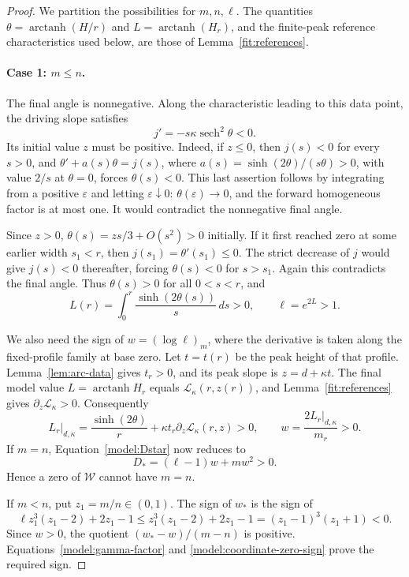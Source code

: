 \begin{proof}
We partition the possibilities for \(m,n,\ell\).
The quantities \(\theta=\operatorname{arctanh}(H/r)\) and
\(L=\operatorname{arctanh}(H_r)\), and the finite-peak reference
characteristics used below, are those of Lemma~\ref{fit:references}.

\paragraph{Case 1: \(m\le n\).}
The final angle is nonnegative.  Along the characteristic leading to
this data point, the driving slope satisfies
\[
 j'=-s\kappa\operatorname{sech}^2\theta<0.
\]
Its initial value \(z\) must be positive.  Indeed, if \(z\le0\), then
\(j(s)<0\) for every \(s>0\), and
\(\theta'+a(s)\theta=j(s)\), where
\(a(s)=\sinh(2\theta)/(s\theta)>0\), with value \(2/s\) at
\(\theta=0\), forces \(\theta(s)<0\).  This last assertion follows by
integrating from a positive \(\varepsilon\) and letting
\(\varepsilon\downarrow0\): \(\theta(\varepsilon)\to0\), and the
forward homogeneous factor is at most one.
It would contradict the nonnegative final angle.

Since \(z>0\), \(\theta(s)=zs/3+O(s^2)>0\) initially.
If it first reached zero at some earlier width \(s_1<r\), then
\(j(s_1)=\theta'(s_1)\le0\).  The strict decrease of \(j\) would give
\(j(s)<0\) thereafter, forcing \(\theta(s)<0\) for \(s>s_1\).
Again this contradicts the final angle.  Thus
\(\theta(s)>0\) for all \(0<s<r\), and
\[
 L(r)=\int_0^r\frac{\sinh(2\theta(s))}{s}\,ds>0,
 \qquad \ell=e^{2L}>1.
\]

We also need the sign of \(w=(\log\ell)_m\), where the derivative
is taken along the fixed-profile family at base zero. Let \(t=t(r)\)
be the peak height of that profile.
Lemma~\ref{lem:arc-data} gives \(t_r>0\), and its peak slope is
\(z=d+\kappa t\).  The final model value \(L=\operatorname{arctanh}H_r\)
equals \(\mathcal L_\kappa(r,z(r))\), and
Lemma~\ref{fit:references} gives \(\partial_z\mathcal L_\kappa>0\).
Consequently
\begin{equation}
 L_r\big|_{d,\kappa}
 =\frac{\sinh(2\theta)}r
   +\kappa t_r\partial_z\mathcal L_\kappa(r,z)>0,\qquad
 w=\frac{2L_r|_{d,\kappa}}{m_r}>0.
 \label{model:w-positive-nonnegative-angle}
\end{equation}
If \(m=n\), Equation~\eqref{model:Dstar} now reduces to
\[
 D_*=(\ell-1)w+mw^2>0.
\]
Hence a zero of \(\mathcal W\) cannot have \(m=n\).

If \(m<n\), put \(z_1=m/n\in(0,1)\).  The sign of \(w_*\) is the sign
of
\[
 \ell z_1^3(z_1-2)+2z_1-1
 \le z_1^3(z_1-2)+2z_1-1
 =(z_1-1)^3(z_1+1)<0.
\]
Since \(w>0\), the quotient \((w_*-w)/(m-n)\) is positive.
Equations~\eqref{model:gamma-factor} and
\eqref{model:coordinate-zero-sign} prove the required sign.


\end{proof}
